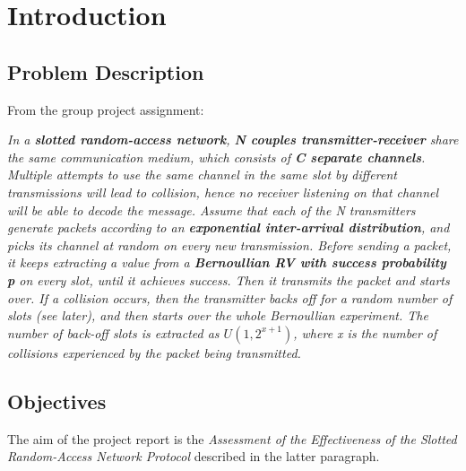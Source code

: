\section{Introduction}
\subsection{Problem Description}
From the group project assignment:
\vspace{0.4cm}

\textit{In a \textbf{slotted random-access network}, \textbf{N couples transmitter-receiver} share the same communication
medium, which consists of \textbf{C separate channels}. Multiple attempts to use the same channel in the
same slot by different transmissions will lead to collision, hence no receiver listening on that
channel will be able to decode the message.
Assume that each of the N transmitters generate packets according to an \textbf{exponential inter-arrival
distribution}, and picks its channel at random on every new transmission. Before sending a packet, it
keeps extracting a value from a \textbf{Bernoullian RV with success probability p} on every slot, until it
achieves success. Then it transmits the packet and starts over. If a collision occurs, then the
transmitter backs off for a random number of slots (see later), and then starts over the whole
Bernoullian experiment.
The number of back-off slots is extracted as $U(1, 2^{x+1})$, where x is the number of collisions
experienced by the packet being transmitted.}
\subsection{Objectives}
The aim of the project report is the \textit{Assessment of the Effectiveness of the Slotted Random-Access Network Protocol} described in the latter paragraph.
